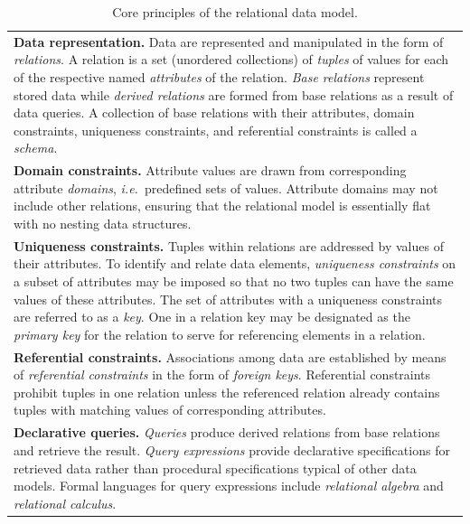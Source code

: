 \documentclass[letter,10pt]{article}
\begin{document}
\tabulinesep=6pt
\begin{table}[ht]
\begin{tabu}{|X|}
\hline
{\bf Data representation.} Data are represented and manipulated in the form of \emph{relations}. 
A relation is a set (unordered collections) of \emph{tuples} of values for each of the respective named \emph{attributes} of the relation.
\emph{Base relations} represent stored data while \emph{derived relations} are formed from base relations as a result of data queries.
A collection of base relations with their attributes, domain constraints, uniqueness constraints, and referential constraints is called a \emph{schema}.

\\
{\bf Domain constraints.} Attribute values are drawn from corresponding attribute \emph{domains}, \emph{i.e.}\ predefined sets of values.
Attribute domains may not include other relations, ensuring that the relational model is essentially flat with no nesting data structures.

\\
{\bf Uniqueness constraints.} Tuples within relations are addressed by values of their attributes.
To identify and relate data elements, \emph{uniqueness constraints} on a subset of attributes may be imposed so that no two tuples can have the same values of these attributes.  The set of attributes with a uniqueness constraints are referred to as a \emph{key}. One in a relation key may be designated as the \emph{primary key} for the relation to serve for referencing elements in a relation.

\\
{\bf Referential constraints.} Associations among data are established by means of \emph{referential constraints} in the form of \emph{foreign keys}. 
Referential constraints prohibit tuples in one relation unless the referenced relation already contains tuples with matching values of corresponding attributes. 

\\
{\bf Declarative queries.} \emph{Queries} produce derived relations from base relations and retrieve the result.  
\emph{Query expressions} provide declarative specifications for retrieved data rather than procedural specifications typical of other data models. 
Formal languages for query expressions include \emph{relational algebra} and \emph{relational calculus}.  
\\
\hline
\end{tabu}
\caption{Core principles of the relational data model.}
\label{tab:core}
\end{table}
\end{document}

